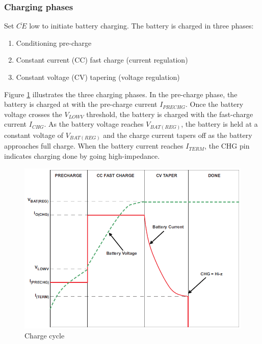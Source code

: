 \documentclass[11pt,a4paper]{article}
\begin{document}
\subsubsection{Charging phases}\label{sec:charging_phases}
Set $\overline{CE}$ low to initiate battery charging. The battery is charged in three phases: 
\begin{enumerate}
	\item Conditioning pre-charge
	\item Constant current (CC) fast charge (current regulation) 
	\item Constant voltage (CV) tapering (voltage regulation)
\end{enumerate}
Figure \ref{fig:Charge _cycle} illustrates the three charging phases. In the pre-charge phase, the battery is charged at with the pre-charge current $I_{PRECHG}$. Once the battery voltage crosses the $V_{LOWV}$ threshold, the battery is charged with the fast-charge current $I_{CHG}$. As the battery voltage reaches $V_{BAT(REG)}$, the battery is held at a constant voltage of $V_{BAT(REG)}$ and the charge current tapers off as the battery approaches full charge. When the battery current reaches $I_{TERM}$, the CHG pin indicates charging done by going high-impedance.
\begin{figure}[H]
	\centering
	\includegraphics[width=1.0\linewidth]{Charge_cycle}
	\caption{Charge cycle \cite{bib:BQ24075}}
	\label{fig:Charge _cycle}
\end{figure}
\end{document}
